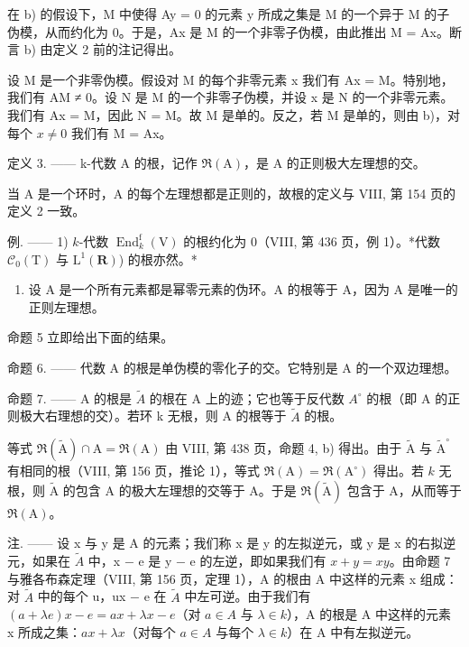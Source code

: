 在 b) 的假设下，M 中使得 Ay = 0 的元素 y 所成之集是 M 的一个异于 M 的子伪模，从而约化为 0。于是，Ax 是 M 的一个非零子伪模，由此推出 M = Ax。断言 b) 由定义 2 前的注记得出。

设 M 是一个非零伪模。假设对 M 的每个非零元素 x 我们有 Ax = M。特别地，我们有 AM ≠ 0。设 N 是 M 的一个非零子伪模，并设 x 是 N 的一个非零元素。我们有 Ax = M，因此 N = M。故 M 是单的。反之，若 M 是单的，则由 b)，对每个 \(x \neq 0\) 我们有 M = Ax。

定义 3. —— k-代数 A 的根，记作 \(\Re(\mathrm{A})\)，是 A 的正则极大左理想的交。

当 A 是一个环时，A 的每个左理想都是正则的，故根的定义与 VIII, 第 154 页的定义 2 一致。

例. —— 1) \(k\)-代数 \(\operatorname{End}_k^{\mathrm{f}}(\mathrm{V})\) 的根约化为 0（VIII, 第 436 页，例 1）。*代数 \(\mathcal{C}_0(\mathrm{T})\) 与 \(\mathrm{L}^1 (\mathbf{R})\)) 的根亦然。*

\begin{enumerate}
\def\labelenumi{\arabic{enumi})}
\setcounter{enumi}{1}
\tightlist
\item
  设 A 是一个所有元素都是幂零元素的伪环。A 的根等于 A，因为 A 是唯一的正则左理想。
\end{enumerate}

命题 5 立即给出下面的结果。

命题 6. —— 代数 A 的根是单伪模的零化子的交。它特别是 A 的一个双边理想。

命题 7. —— A 的根是 \(\widetilde{A}\) 的根在 A 上的迹；它也等于反代数 \(A^{\circ}\) 的根（即 A 的正则极大右理想的交）。若环 k 无根，则 A 的根等于 \(\widetilde{A}\) 的根。

等式 \(\Re (\widetilde{\mathrm{A}})\cap \mathrm{A} = \Re (\mathrm{A})\) 由 VIII, 第 438 页，命题 4, b) 得出。由于 \(\widetilde{\mathrm{A}}\) 与 \(\widetilde{\mathrm{A}}^{\circ}\) 有相同的根（VIII, 第 156 页，推论 1），等式 \(\Re (\mathrm{A}) = \Re (\mathrm{A}^{\circ})\) 得出。若 \(k\) 无根，则 \(\widetilde{\mathrm{A}}\) 的包含 A 的极大左理想的交等于 A。于是 \(\Re (\widetilde{\mathrm{A}})\) 包含于 A，从而等于 \(\Re (\mathrm{A})\)。

注. —— 设 x 与 y 是 A 的元素；我们称 x 是 y 的左拟逆元，或 y 是 x 的右拟逆元，如果在 \(\widetilde{A}\) 中，x − e 是 y − e 的左逆，即如果我们有 \(x + y = xy\)。由命题 7 与雅各布森定理（VIII, 第 156 页，定理 1），A 的根由 A 中这样的元素 x 组成：对 \(\widetilde{A}\) 中的每个 u，ux − e 在 \(\widetilde{A}\) 中左可逆。由于我们有 \((a + \lambda e)x - e = ax + \lambda x - e\)（对 \(a \in A\) 与 \(\lambda \in k\)），A 的根是 A 中这样的元素 x 所成之集：\(ax + \lambda x\)（对每个 \(a \in A\) 与每个 \(\lambda \in k\)）在 A 中有左拟逆元。

